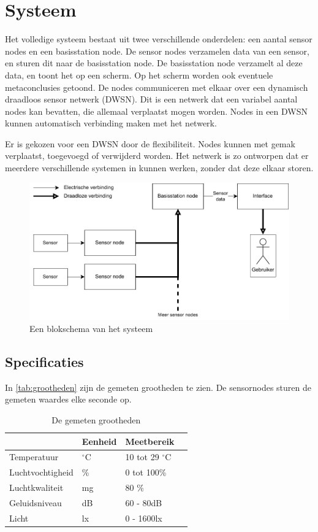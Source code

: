 \section{Systeem}
Het volledige systeem bestaat uit twee verschillende onderdelen: een aantal sensor nodes en een basisstation node.
De sensor nodes verzamelen data van een sensor, en sturen dit naar de basisstation node. De basisstation node verzamelt al deze data, en toont het op een scherm. Op het scherm worden ook eventuele metaconclusies getoond.
De nodes communiceren met elkaar over een dynamisch draadloos sensor netwerk (DWSN).
Dit is een netwerk dat een variabel aantal nodes kan bevatten, die allemaal verplaatst mogen worden. Nodes in een DWSN kunnen automatisch verbinding maken met het netwerk.

Er is gekozen voor een DWSN door de flexibiliteit. Nodes kunnen met gemak verplaatst, toegevoegd of verwijderd worden. Het netwerk is zo ontworpen dat er meerdere verschillende systemen in kunnen werken, zonder dat deze  elkaar storen.

\begin{figure}[ht]
    \centering
    \includegraphics{img/fullsystem.pdf}
    \caption{Een blokschema van het systeem}
    \label{fig:fullsystem}
\end{figure}

\subsection{Specificaties}

In \autoref{tab:grootheden} zijn de gemeten grootheden te zien.
De sensornodes sturen de gemeten waardes elke seconde op. 

\begin{table}[ht]
    \centering
    \begin{tabular}{l||l|l|l}
        & Eenheid & Meetbereik\\
        \hline
        Temperatuur      & $^{\circ}$C & 10 tot 29 $^{\circ}$C & \\
        Luchtvochtigheid & \% & 0 tot 100\% &  \\
        Luchtkwaliteit   & mg & 80 \%       &  \cite{voc-luchtkwaliteit} \\
        Geluidsniveau    & dB & 60 - 80dB   &  \cite{geluid-levels} \\
        Licht            & lx & 0 - 1600lx  & 
    \end{tabular}
    \caption{De gemeten grootheden}
    \label{tab:grootheden}
\end{table}

